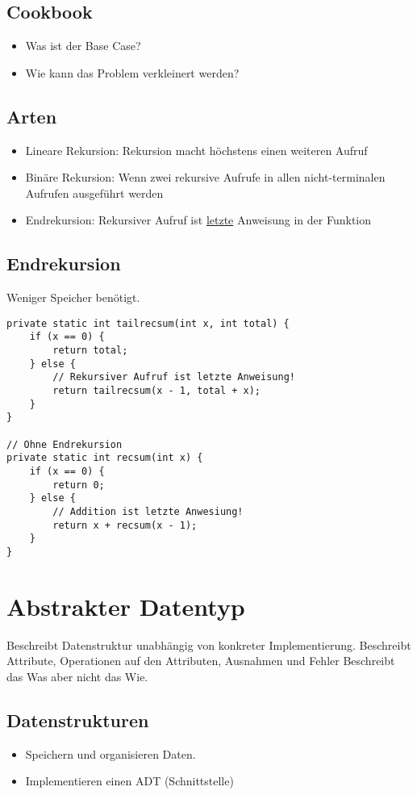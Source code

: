 \begin{multicols*}{4}
	\subsection{Cookbook}
		\begin{itemize}
			\item Was ist der Base Case?
			\item Wie kann das Problem verkleinert werden?
		\end{itemize}
	
	\subsection{Arten}
		\begin{itemize}
			\item Lineare Rekursion: Rekursion macht höchstens einen weiteren Aufruf
			\item Binäre Rekursion: Wenn zwei rekursive Aufrufe in allen nicht-terminalen Aufrufen ausgeführt werden
			\item Endrekursion: Rekursiver Aufruf ist \underline{letzte} Anweisung in der Funktion
		\end{itemize}

	\subsection{Endrekursion}
	Weniger Speicher benötigt.
		\begin{lstlisting}
private static int tailrecsum(int x, int total) {
	if (x == 0) {
		return total;
	} else {
		// Rekursiver Aufruf ist letzte Anweisung!
		return tailrecsum(x - 1, total + x);
	}
}

// Ohne Endrekursion
private static int recsum(int x) {
	if (x == 0) {
		return 0;
	} else {
		// Addition ist letzte Anwesiung!
		return x + recsum(x - 1);
	}
}
		\end{lstlisting}

\section{Abstrakter Datentyp}
Beschreibt Datenstruktur unabhängig von konkreter Implementierung.
Beschreibt Attribute, Operationen auf den Attributen, Ausnahmen und Fehler
Beschreibt das Was aber nicht das Wie.

\subsection{Datenstrukturen}
	\begin{itemize}
		\item Speichern und organisieren Daten.
		\item Implementieren einen ADT (Schnittstelle)
	\end{itemize}


\end{multicols*}
